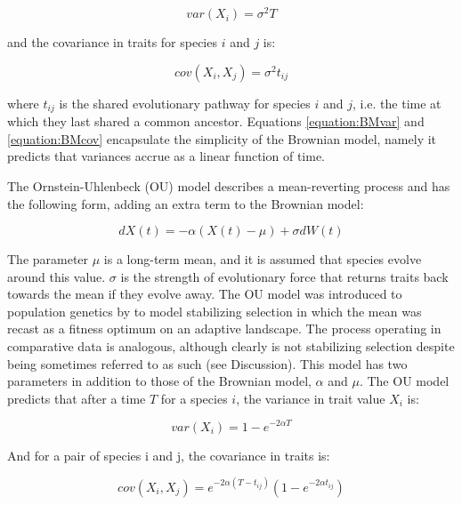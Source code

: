 \documentclass[a4paper,12pt]{article}
\begin{document}
  \begin{equation}
    var(X_i) = \sigma^2 T
    \label{equation:BMvar} 
  \end{equation}

and the covariance in traits for species $i$ and $j$ is:
  
  \begin{equation}
    cov(X_i,X_j) = \sigma^2 t_{ij}
    \label{equation:BMcov} 
  \end{equation}

where $t_{ij}$ is the shared evolutionary pathway for species $i$ and $j$, i.e. the time at which they last shared a common ancestor.  Equations \ref{equation:BMvar} and \ref{equation:BMcov} encapsulate the simplicity of the Brownian model, namely it predicts that variances accrue as a linear function of time. 

The Ornstein-Uhlenbeck (OU) model describes a mean-reverting process and has the following form, adding an extra term to the Brownian model:

  \begin{equation}
    dX(t) = - \alpha (X(t) - \mu) + \sigma dW(t)
    \label{equation:OUrate} 
  \end{equation}

The parameter $\mu$ is a long-term mean, and it is assumed that species evolve around this value. $\sigma$ is the strength of evolutionary force that returns traits back towards the mean if they evolve away. The OU model was introduced to population genetics by \citet{Lande:1976aa} to model stabilizing selection in which the mean was recast as a fitness optimum on an adaptive landscape. The process operating in comparative data is analogous, although clearly is not stabilizing selection despite being sometimes referred to as such (see Discussion). This model has two parameters in addition to those of the Brownian model, $\alpha$ and $\mu$.
The OU model predicts that after a time $T$ for a species $i$, the variance in trait value $X_i$ is:

  \begin{equation}
    var(X_i) = 1 - e^{-2 \alpha T}
    \label{equation:OUvar} 
  \end{equation}

And for a pair of species i and j, the covariance in traits is:

  \begin{equation}
    cov(X_i, X_j) = e^{-2 \alpha (T - t_{ij})} (1 - e^{-2\alpha t_{ij}})
    \label{equation:OUcov} 
  \end{equation}
\end{document}
